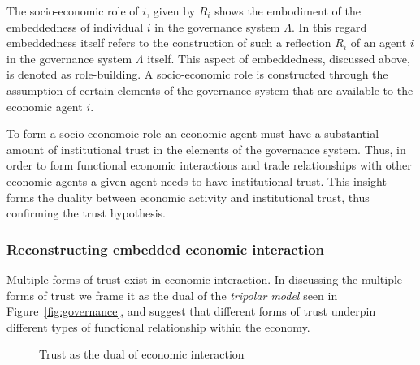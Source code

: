\begin{subappendices}
The socio-economic role of $i$, given by $R_{i}$ shows the embodiment of the embeddedness of individual $i$ in the governance system $\Lambda$. In this regard embeddedness itself refers to the construction of such a reflection $R_{i}$ of an agent $i$ in the governance system $\Lambda$ itself. This aspect of embeddedness, discussed above, is denoted as role-building. A socio-economic role is constructed through the assumption of certain elements of the governance system that are available to the economic agent $i$.

To form a socio-economoic role an economic agent must have a substantial amount of institutional trust in the elements of the governance system. Thus, in order to form functional economic interactions and trade relationships with other economic agents a given agent needs to have institutional trust. This insight forms the duality between economic activity and institutional trust, thus confirming the trust hypothesis.

\subsubsection{Reconstructing embedded economic interaction}

Multiple forms of trust exist in economic interaction. In discussing the multiple forms of trust we frame it as the dual of the \textit{tripolar model} seen in Figure~\ref{fig:governance}, and suggest that different forms of trust underpin different types of functional relationship within the economy.

\begin{figure}[t]
\begin{center}
\end{center}
\caption{Trust as the dual of economic interaction}
\label{dualityoftrust}
\end{figure}


\end{subappendices}
